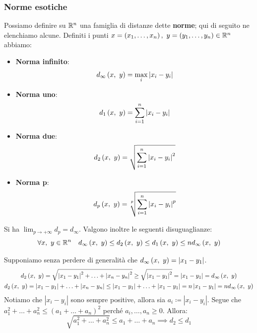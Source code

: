 \subsubsection{Norme esotiche}
Possiamo definire su $\mathbb{R}^n$ una famiglia di distanze dette \textbf{norme}; qui di seguito ne elenchiamo alcune. Definiti i punti $x=\left(x_1,\ldots, x_n\right),\ y=\left(y_1,\ldots, y_n\right)\in\realset^n$ abbiamo:
\begin{multicols}{2}
	\begin{itemize}
	\item \textbf{Norma infinito}:
	\[d_\infty\left(x,\ y\right)=\max_{i}{\left|x_i-y_i\right|}\]
	\item \textbf{Norma uno}:
	\[d_1\left(x,\ y\right)=\sum_{i=1}^{n}\left|x_i-y_i\right|\]
\end{itemize}
\begin{itemize}
	\item \textbf{Norma due}:
	\[d_2\left(x,\ y\right)=\sqrt{\sum_{i=1}^{n}\left|x_i-y_i\right|^2}\]
	\item \textbf{Norma p}:
	\[\mvf{d_p}{x}{y}=\sqrt[\leftroot{1}\uproot{3}p]{\sum_{i=1}^{n}\left|x_i-y_i\right|^p}\]
\end{itemize}
\end{multicols}
Si ha $\displaystyle \lim_{p \to +\infty}d_p=d_\infty$. Valgono inoltre le seguenti disuguaglianze:
\begin{equation}
\forall x,\ y\in\mathbb{R}^n\quad d_\infty\left(x,\ y\right)\leq d_2\left(x,\ y\right)\leq d_1\left(x,\ y\right)\leq nd_\infty\left(x,\ y\right)
\end{equation}
\vspace{-6mm}
\begin{demonstration}
Supponiamo senza perdere di generalità che $d_\infty\left(x,\ y\right)=\left|x_1-y_1\right|$.
\begin{gather*}
d_2\left(x,\ y\right)=\sqrt{\left|x_1-y_1\right|^2+\ldots+\left|x_n-y_n\right|^2}\geq\sqrt{\left|x_1-y_1\right|^2}=\left|x_1-y_1\right|=d_\infty\left(x,\ y\right)\\
d_2\left(x,\ y\right)=\left|x_1-y_1\right|+\ldots+\left|x_n-y_n\right|\leq\left|x_1-y_1\right|+\ldots+\left|x_1-y_1\right|=n\left|x_1-y_1\right|=nd_\infty\left(x,\ y\right)
\end{gather*}
Notiamo che $\left|x_i-y_i\right|$ sono sempre positive, allora sia $a_i\coloneqq\left|x_i-y_i\right|$. Segue che $a_1^2+\ldots+a_n^2\leq (a_1+\ldots+a_n)^2$ perché $a_i,\ldots,a_n\geq0$. Allora:
\begin{equation*}
\sqrt{a_1^2+\ldots+a_n^2}\leq a_1+\ldots+a_n\implies d_2\leq d_1
\end{equation*}
\vspace{-6mm}
\end{demonstration}
